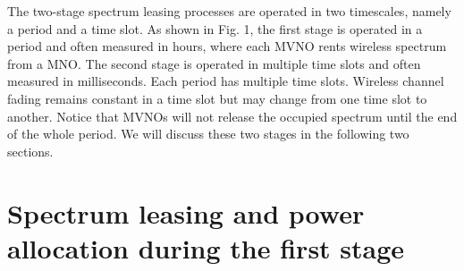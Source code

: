 \documentclass[journal]{IEEEtran}
\begin{document}
The two-stage spectrum leasing processes are operated in two timescales, namely a period and a time slot. As shown in Fig. 1, the first stage is operated in a period and often measured in hours, where each MVNO rents wireless spectrum from a MNO. The second stage is operated in multiple time slots and often measured in milliseconds. Each period has multiple time slots. Wireless channel fading remains constant in a time slot but may change from one time slot to another. Notice that MVNOs will not release the occupied spectrum until the end of the whole period. We will discuss these two stages in the following two sections.

\section{Spectrum leasing and power allocation during the first stage}
\end{document}
